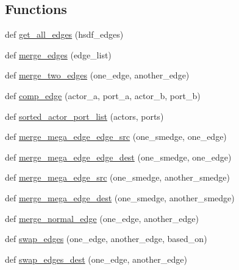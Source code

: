 \subsection*{Functions}
\begin{DoxyCompactItemize}
\item 
def \hyperlink{namespacesylva_1_1glic_1_1glic_a113a86d012f0236519ec7ac19e0e4850}{get\+\_\+all\+\_\+edges} (hsdf\+\_\+edges)
\item 
def \hyperlink{namespacesylva_1_1glic_1_1glic_aaac34d7c86749beb842e5be3f547d1ec}{merge\+\_\+edges} (edge\+\_\+list)
\item 
def \hyperlink{namespacesylva_1_1glic_1_1glic_a3230a4ec28a3787a073288b4532675cc}{merge\+\_\+two\+\_\+edges} (one\+\_\+edge, another\+\_\+edge)
\item 
def \hyperlink{namespacesylva_1_1glic_1_1glic_aa441c66a03eed575ba427151f3567a0e}{comp\+\_\+edge} (actor\+\_\+a, port\+\_\+a, actor\+\_\+b, port\+\_\+b)
\item 
def \hyperlink{namespacesylva_1_1glic_1_1glic_af9c053311339f7220d8a605b492126c0}{sorted\+\_\+actor\+\_\+port\+\_\+list} (actors, ports)
\item 
def \hyperlink{namespacesylva_1_1glic_1_1glic_adaac876d9630352fd0f5e4e3350d5b30}{merge\+\_\+mega\+\_\+edge\+\_\+edge\+\_\+src} (one\+\_\+smedge, one\+\_\+edge)
\item 
def \hyperlink{namespacesylva_1_1glic_1_1glic_aaa193270639d512daa1cf9fc2f952fdb}{merge\+\_\+mega\+\_\+edge\+\_\+edge\+\_\+dest} (one\+\_\+smedge, one\+\_\+edge)
\item 
def \hyperlink{namespacesylva_1_1glic_1_1glic_aa4a9eb6227bd109eec96e5c1ad6579c5}{merge\+\_\+mega\+\_\+edge\+\_\+src} (one\+\_\+smedge, another\+\_\+smedge)
\item 
def \hyperlink{namespacesylva_1_1glic_1_1glic_a80e6906ee9b3a3c96085594f6dab2f84}{merge\+\_\+mega\+\_\+edge\+\_\+dest} (one\+\_\+smedge, another\+\_\+smedge)
\item 
def \hyperlink{namespacesylva_1_1glic_1_1glic_a1d03fa1322fc331579ff650ea5612ce8}{merge\+\_\+normal\+\_\+edge} (one\+\_\+edge, another\+\_\+edge)
\item 
def \hyperlink{namespacesylva_1_1glic_1_1glic_aa33f0fa18db2dc181313352cfdbc0cca}{swap\+\_\+edges} (one\+\_\+edge, another\+\_\+edge, based\+\_\+on)
\item 
def \hyperlink{namespacesylva_1_1glic_1_1glic_a478b14bc177ffdfb87bc422a3e2fa0f1}{swap\+\_\+edges\+\_\+dest} (one\+\_\+edge, another\+\_\+edge)
\item 

\end{DoxyCompactItemize}
